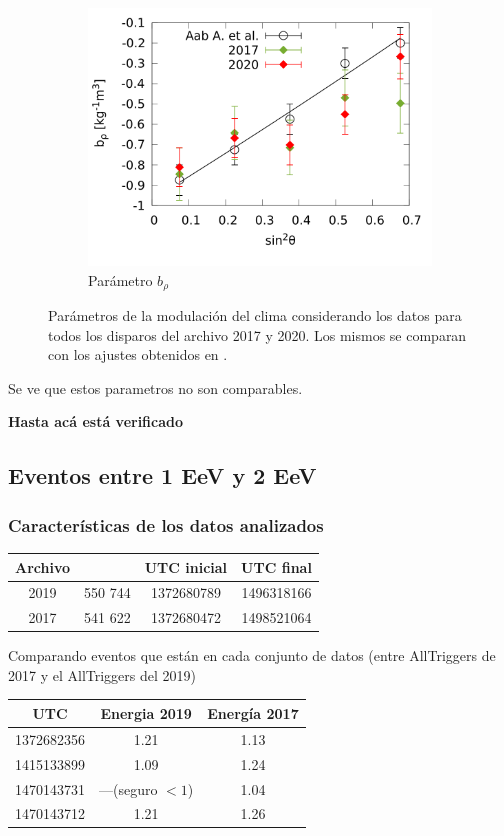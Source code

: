 \begin{figure}[H]
\begin{subfigure}[b]{\textwidth}
					\centering
					\includegraphics[width=0.5\linewidth]{../Anisotropia/params/brho_2017_2020_above_1EeV.png}
					\caption{Parámetro  $b_\rho$	 }
					\end{subfigure}%
					\caption{Parámetros de la modulación del clima considerando los datos para todos los disparos del archivo 2017 y 2020. Los mismos se comparan con los ajustes obtenidos en \cite{aab2017impact}.}
				\end{figure}

			Se ve que estos parametros no son comparables. 

{\bf Hasta acá está verificado}

		\subsection{Eventos entre 1 EeV y 2 EeV }
			\subsubsection{Características de los datos analizados}

					\begin{table}[H]
					\centering
						\begin{tabular}{c|c|c|c}
							\textbf{Archivo} & \text{Eventos} & UTC inicial &  UTC final  \\ \hline
							2019			 & 550 744 		  &	1372680789  & 1496318166\\
							2017			 & 541 622		  & 1372680472  & 1498521064\\
						\end{tabular}
					\end{table}


					Comparando eventos que están en cada conjunto de datos (entre AllTriggers de 2017 y el AllTriggers del 2019)

					\begin{table}[H]
					\centering
					
						\begin{tabular}{c| c| c}
						UTC  		& Energia 2019 & Energía 2017\\ \hline
						1372682356  & 1.21			 & 1.13 		\\
						1415133899  & 1.09			 & 1.24			\\
						1470143731  & ---(seguro $<1$) & 1.04 		\\
						1470143712	& 1.21			 & 1.26
						
						\end{tabular}
					\end{table}

